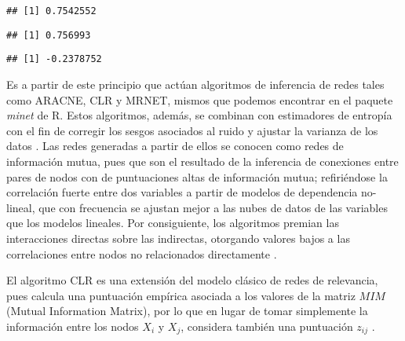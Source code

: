 \documentclass[
]{book}
\newenvironment{Shaded}{\begin{snugshade}}{\end{snugshade}}
\newcommand{\KeywordTok}[1]{\textcolor[rgb]{0.13,0.29,0.53}{\textbf{#1}}}
\newcommand{\NormalTok}[1]{#1}
\newcommand{\OperatorTok}[1]{\textcolor[rgb]{0.81,0.36,0.00}{\textbf{#1}}}
\begin{document}
\begin{verbatim}
## [1] 0.7542552
\end{verbatim}

\begin{Shaded}
\end{Shaded}

\begin{verbatim}
## [1] 0.756993
\end{verbatim}

\begin{Shaded}
\end{Shaded}

\begin{verbatim}
## [1] -0.2378752
\end{verbatim}

Es a partir de este principio que actúan algoritmos de inferencia de redes tales como ARACNE, CLR y MRNET, mismos que podemos encontrar en el paquete \emph{minet} de R. Estos algoritmos, además, se combinan con estimadores de entropía con el fin de corregir los sesgos asociados al ruido y ajustar la varianza de los datos \citep{villaintroduction}. Las redes generadas a partir de ellos se conocen como redes de información mutua, pues que son el resultado de la inferencia de conexiones entre pares de nodos con de puntuaciones altas de información mutua; refiriéndose la correlación fuerte entre dos variables a partir de modelos de dependencia no-lineal, que con frecuencia se ajustan mejor a las nubes de datos de las variables que los modelos lineales. Por consiguiente, los algoritmos premian las interacciones directas sobre las indirectas, otorgando valores bajos a las correlaciones entre nodos no relacionados directamente \citep{meyer2008minet}.

El algoritmo CLR es una extensión del modelo clásico de redes de relevancia, pues calcula una puntuación empírica asociada a los valores de la matriz \(MIM\) (Mutual Information Matrix), por lo que en lugar de tomar simplemente la información entre los nodos \(X_i\) y \(X_j\), considera también una puntuación \(z_{ij}\) \citep{meyer2008minet}.
\end{document}
